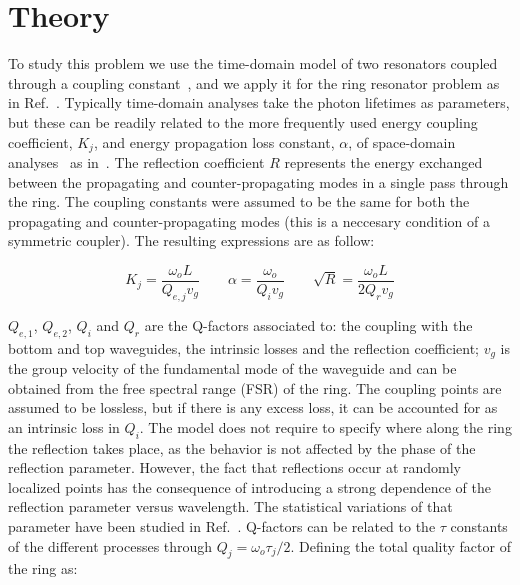 \documentclass[10pt,letterpaper]{article}
\begin{document}
\section{Theory}
\label{sec:theory}

To study this problem we use the time-domain model of two resonators coupled through a coupling constant~\cite{Haus1984}, and we apply it for the ring resonator problem as in Ref.~\cite{Zhang2008}.
Typically time-domain analyses take the photon lifetimes as parameters, but these can be readily related to the more frequently used energy coupling coefficient, $K_j$, and energy propagation loss constant, $\alpha$, of space-domain analyses~\cite{J.HeebnerR.Grover2008} as in~\cite{Little1997}. The reflection coefficient $R$ represents the energy exchanged between the propagating and counter-propagating modes in a single pass through the ring. The coupling constants were assumed to be the same for both the propagating and counter-propagating modes (this is a neccesary condition of a symmetric coupler). The resulting expressions are as follow:

\begin{equation}
    K_j=\frac{\omega_oL}{Q_{e,j} v_g}  \qquad \alpha=\frac{\omega_o}{Q_i v_g} \qquad \sqrt{R}=\frac{\omega_oL}{2Q_rv_g}
\label{eq:space-constants}
\end{equation}

$Q_{e,1}$, $Q_{e,2}$, $Q_{i}$ and $Q_{r}$ are the Q-factors associated to: the coupling with the bottom and top waveguides, the intrinsic losses and the reflection coefficient; $v_g$ is the group velocity of the fundamental mode of the waveguide and can be obtained from the free spectral range (FSR) of the ring. The coupling points are assumed to be lossless, but if there is any excess loss, it can be accounted for as an intrinsic loss in $Q_i$. The model does not require to specify where along the ring the reflection takes place, as the behavior is not affected by the phase of the reflection parameter. However, the fact that reflections occur at randomly localized points has the consequence of introducing a strong dependence of the reflection parameter versus wavelength. The statistical variations of that parameter have been studied in Ref.~\cite{Morichetti2010}. Q-factors can be related to the $\tau$ constants of the different processes through $Q_j=\omega_o \tau_j/2$. Defining the total quality factor of the ring as:
\end{document}
